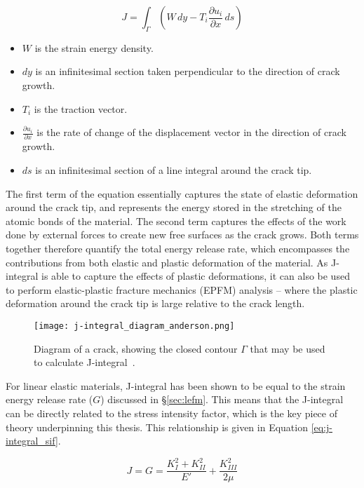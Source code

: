 \begin{equation}
	J = \int_{\Gamma} \left( W \, dy - T_i \frac{\partial u_i}{\partial x} \, ds \right)\label{eq:j-integral}
\end{equation}

\begin{itemize}
	\item $W$ is the strain energy density.
	\item $dy$ is an infinitesimal section taken perpendicular to the direction of crack growth.
	\item $T_i$ is the traction vector.
	\item $\frac{\partial{u_i}}{\partial{x}}$ is the rate of change of the displacement vector in the direction of crack growth.
	\item $ds$ is an infinitesimal section of a line integral around the crack tip.
\end{itemize}

The first term of the equation essentially captures the state of elastic deformation around the crack tip, and represents the energy stored in the stretching of the atomic bonds of the material. The second term captures the effects of the work done by external forces to create new free surfaces as the crack grows. Both terms together therefore quantify the total energy release rate, which encompasses the contributions from both elastic and plastic deformation of the material. As J-integral is able to capture the effects of plastic deformations, it can also be used to perform elastic-plastic fracture mechanics (EPFM) analysis -- where the plastic deformation around the crack tip is large relative to the crack length.

\begin{figure}[H]
	\centering
	\texttt{[image: j-integral\_diagram\_anderson.png]}
	\caption{Diagram of a crack, showing the closed contour $\Gamma$ that may be used to calculate J-integral\ \cite{anderson_fracture_2017}.}\label{fig:j-integral_diagram_anderson}
\end{figure}

For linear elastic materials, J-integral has been shown to be equal to the strain energy release rate ($G$) discussed in \S\ref{sec:lefm}. This means that the J-integral can be directly related to the stress intensity factor, which is the key piece of theory underpinning this thesis. This relationship is given in Equation \ref{eq:j-integral_sif}.

\begin{equation}
	J = G = \frac{K_I^2 + K_{II}^2}{E'} + \frac{K_{III}^2}{2 \mu}
	\label{eq:j-integral_sif}
\end{equation}

